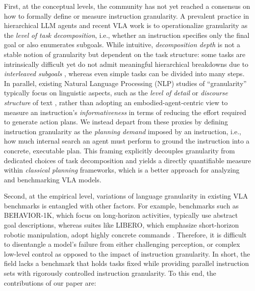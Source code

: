 \documentclass{article}
\begin{document}
First, at the conceptual levels, the community has not yet reached a consensus on how to formally define or measure instruction granularity. 
A prevalent practice in hierarchical LLM agents \cite{DBLP:conf/wuwnet/Yang0H24} and recent VLA work \cite{DBLP:conf/corl/MyersZMFL24,DBLP:conf/icml/ShiIEKPVTWWFLDG25,zhong2025survey} is to operationalize granularity as the \emph{level of task decomposition}, i.e., whether an instruction specifies only the final goal or also enumerates subgoals. 
While intuitive, \emph{decomposition depth} is not a stable notion of granularity but dependent on the task structure: some tasks are intrinsically difficult yet do not admit meaningful hierarchical breakdowns due to \emph{interleaved subgoals} \cite{sussman1975computer}, whereas even simple tasks can be divided into many steps. In parallel, existing Natural Language Processing (NLP) studies of ``granularity'' typically focus on linguistic aspects, such as the \emph{level of detail} or \emph{discourse structure} of text \cite{dong-lapata-2018-coarse,huang-etal-2025-musc}, rather than adopting an embodied-agent-centric view to measure an instruction's \emph{informativeness} in terms of reducing the effort required to generate action plans. We instead depart from these proxies by defining instruction granularity as the \emph{planning demand} imposed by an instruction, i.e., how much internal search an agent must perform to ground the instruction into a concrete, executable plan. This framing explicitly decouples granularity from dedicated choices of task decomposition and yields a directly quantifiable measure within \emph{classical planning} frameworks, which is a better approach for analyzing and benchmarking VLA models. 


Second, at the empirical level, variations of language granularity in existing VLA benchmarks is entangled with other factors. For example, benchmarks such as \textsc{BEHAVIOR-1K}, which focus on long-horizon activities, typically use abstract goal descriptions, whereas suites like \textsc{LIBERO}, which emphasize short-horizon robotic manipulation, adopt highly concrete commands \cite{DBLP:conf/cvpr/ShridharTGBHMZF20,DBLP:conf/corl/0002ZWGSMWLLSAH22,DBLP:conf/nips/LiuZGFLZS23,DBLP:conf/corl/LiHGMPWFLSKL0F024,DBLP:conf/cvpr/MuCCPLGLYZXLXDL25}. Therefore, it is difficult to disentangle a model's failure from either challenging perception, or complex low-level control as opposed to the impact of instruction granularity. In short, the field lacks a benchmark that holds tasks fixed while providing parallel instruction sets with rigorously controlled instruction granularity. To this end, the contributions of our paper are:
\end{document}
